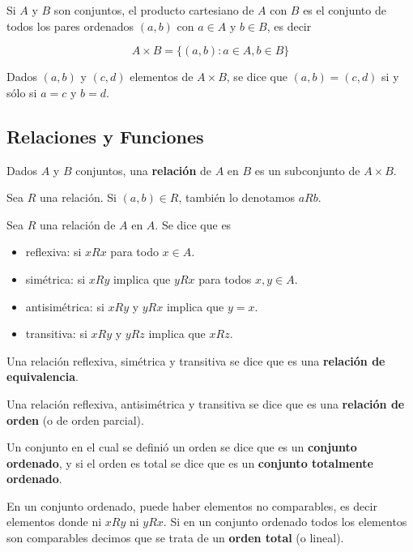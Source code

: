 \begin{definition} 
Si $A$ y $B$ son conjuntos, el producto cartesiano de $A$ con $B$ es el conjunto de todos los pares ordenados $(a,b)$ con $a \in A$ y $b \in B$, es decir

$$ A \times B = \{(a,b) : a \in A, b \in B \}$$

Dados $(a,b)$ y $(c,d)$ elementos de $A \times B$, se dice que $(a,b) = (c,d)$ si y sólo si $a = c$ y $b = d$.
\end{definition}


\subsection{Relaciones y Funciones}

\begin{definition}[Relación] 

Dados $A$ y $B$ conjuntos, una \textbf{relación} de $A$ en $B$ es un subconjunto de $A \times B$.

Sea $R$ una relación.  Si $(a,b) \in R$, también lo denotamos $a R b$.

Sea $R$ una relación de $A$ en $A$.  Se dice que es

\begin{itemize}

\item reflexiva: si $xRx$ para todo $x \in A$.

\item simétrica: si $xRy$ implica que $yRx$ para todos $x,y \in A$.

\item antisimétrica: si $xRy$ y $yRx$ implica que $y=x$.

\item transitiva: si $xRy$ y $yRz$ implica que $xRz$.

\end{itemize}

Una relación reflexiva, simétrica y transitiva se dice que es una \textbf{relación de equivalencia}. 

Una relación reflexiva, antisimétrica y transitiva se dice que es una \textbf{relación de orden} (o de orden parcial). 

Un conjunto en el cual se definió un orden se dice que es un \textbf{conjunto ordenado}, y si el orden es total se dice que es un \textbf{conjunto totalmente ordenado}.

En un conjunto ordenado, puede haber elementos no comparables, es decir elementos donde ni $xRy$ ni $yRx$.  Si en un conjunto ordenado todos los elementos son comparables decimos que se trata de un \textbf{orden total} (o lineal).

\end{definition}

